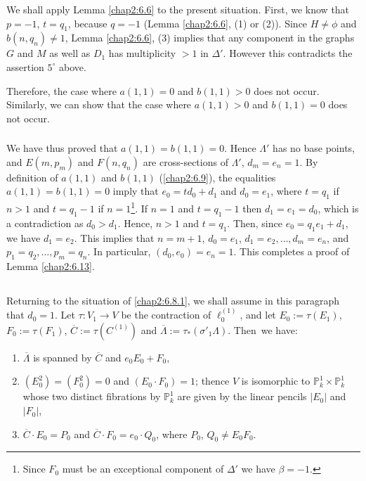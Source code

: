 We shall apply Lemma \ref{chap2:6.6} to the present situation. First, we
know that $p=-1$, \iec $t=q_{1}$, because $q=-1$ (\cf Lemma
\ref{chap2:6.6}, (1) or (2)). Since $H\neq \phi$ and $b(n,q_{n})\neq 1$,
Lemma \ref{chap2:6.6}, (3) implies that any component in the graphs $G$
and $M$ as well as $D_{1}$ has multiplicity $>1$ in $\Delta'$. However
this contradicts the assertion $5^{\circ}$ above.

Therefore, the case where $a(1,1)=0$ and $b(1,1)>0$ does not
occur. Similarly, we can show that the case where $a(1,1)>0$ and
$b(1,1)=0$ does not occur.

\subsubsection{}\label{chap2:6.13.4}
We have thus proved that $a(1,1)=b(1,1)=0$. Hence $\Lambda'$ has no
base points, and $E(m,p_{m})$ and $F(n,q_{n})$ are cross-sections of
$\Lambda'$, \iec $d_{m}=e_{n}=1$. By definition of $a(1,1)$ and
$b(1,1)$ (\cf \ref{chap2:6.9}), the equalities $a(1,1)=b(1,1)=0$ imply that
$e_{0}=td_{0}+d_{1}$ and $d_{0}=e_{1}$, where $t=q_{1}$ if $n>1$ and
$t=q_{1}-1$ if $n=1$\footnote{Since $F_{0}$ must be an exceptional
  component of $\Delta'$ we have $\beta=-1$.}. If $n=1$ and
$t=q_{1}-1$ then $d_{1}=e_{1}=d_{0}$, which is a contradiction as
$d_{0}>d_{1}$. Hence, $n>1$ and $t=q_{1}$. Then, since
$e_{0}=q_{1}e_{1}+d_{1}$, we have $d_{1}=e_{2}$. This implies that
$n=m+1$, $d_{0}=e_{1}$, $d_{1}=e_{2},\ldots,d_{m}=e_{n}$, and
$p_{1}=q_{2},\ldots,p_{m}=q_{n}$. In particular,
$(d_{0},e_{0})=e_{n}=1$. This completes a proof of Lemma \ref{chap2:6.13}.

\subsection{}\label{chap2:6.14}
Returning to the situation of \ref{chap2:6.8.1}, we shall assume in this
paragraph that $d_{0}=1$. Let $\tau:V_{1}\to V$ be the contraction of
$\ell^{(1)}_{0}$, and let $E_{0}:=\tau(E_{1})$, $F_{0}:=\tau(F_{1})$,
$\overline{C}:=\tau(C^{(1)})$ and
$\overline{\Lambda}:=\tau_{\ast}(\sigma'_{1}\Lambda)$. Then\pageoriginale\
we have:
\begin{enumerate}
\renewcommand{\labelenumi}{(\theenumi)}
\item $\overline{\Lambda}$ is spanned by $\overline{C}$ and
  $e_{0}E_{0}+F_{0}$,

\item $(E^{2}_{0})=(F^{2}_{0})=0$ and $(E_{0}\cdot F_{0})=1$; thence
  $V$ is isomorphic to $\mathbb{P}^{1}_{k}\times \mathbb{P}^{1}_{k}$
  whose two distinct fibrations by $\mathbb{P}^{1}_{k}$ are given by
  the linear pencils $|E_{0}|$ and $|F_{0}|$,

\item $\overline{C}\cdot E_{0}=P_{0}$ and $\overline{C}\cdot
  F_{0}=e_{0}\cdot Q_{0}$, where $P_{0}$, $Q_{0}\neq E_{0}F_{0}$.
\end{enumerate}

